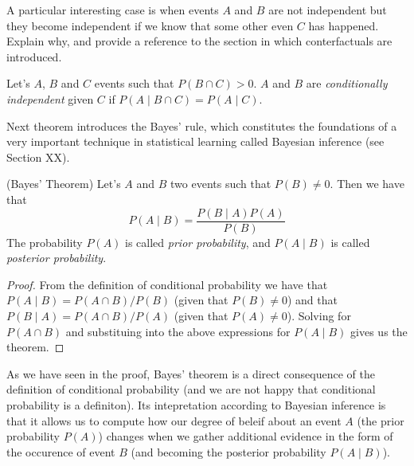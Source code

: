 A particular interesting case is when events $A$ and $B$ are not independent but they become independent if we know that some other even $C$ has happened. {\color{red} Explain why, and provide a reference to the section in which conterfactuals are introduced.}

\begin{definition}
Let's $A$, $B$ and $C$ events such that $P\left( B \cap C \right)>0$. $A$ and $B$ are \emph{conditionally independent} given $C$ if $P\left(A \mid B \cap C \right) = P\left( A \mid C \right)$.
\end{definition}

Next theorem introduces the Bayes' rule, which constitutes the foundations of a very important technique in statistical learning called Bayesian inference (see Section {\color{red} XX}). 

\begin{theorem} (Bayes' Theorem) Let's $A$ and $B$ two events such that $P\left( B \right) \neq 0$. Then we have that
\[
P \left( A \mid B \right) = \frac{P \left( B \mid A \right) P \left( A \right)}{P \left( B \right)}
\]
The probability $P\left( A \right)$ is called \emph{prior probability}, and $P\left( A \mid B \right)$ is called \emph{posterior probability}.
\end{theorem}
\begin{proof}
From the definition of conditional probability we have that $P \left( A \mid B \right) = P \left( A \cap B \right) / P \left( B \right)$ (given that $P \left( B \right) \neq 0$) and that $P \left( B \mid A \right) = P \left( A \cap B \right) / P \left( A \right)$ (given that $P \left( A \right) \neq 0$). Solving for $P(A\cap B)$ and substituing into the above expressions for $P(A\mid B)$ gives us the theorem.
\end{proof}

As we have seen in the proof, Bayes' theorem is a direct consequence of the definition of conditional probability (and we are not happy that conditional probability is a definiton). Its intepretation according to Bayesian inference is that it allows us to compute how our degree of beleif about an event $A$ (the prior probability $P\left( A \right)$) changes when we gather additional evidence in the form of the occurence of event $B$ (and becoming the posterior probability $P\left( A \mid B \right)$).

